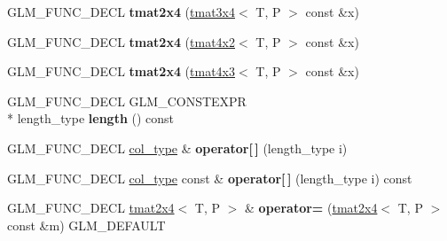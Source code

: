 \begin{DoxyCompactItemize}
\item 
\hypertarget{structglm_1_1tmat2x4_a20757872821d224e17ffb7664190c876}{G\-L\-M\-\_\-\-F\-U\-N\-C\-\_\-\-D\-E\-C\-L {\bfseries tmat2x4} (\hyperlink{structglm_1_1tmat3x4}{tmat3x4}$<$ T, P $>$ const \&x)}\label{structglm_1_1tmat2x4_a20757872821d224e17ffb7664190c876}

\item 
\hypertarget{structglm_1_1tmat2x4_a19f5c9f7ba03b6c8c33c5b0cbf3a6aa2}{G\-L\-M\-\_\-\-F\-U\-N\-C\-\_\-\-D\-E\-C\-L {\bfseries tmat2x4} (\hyperlink{structglm_1_1tmat4x2}{tmat4x2}$<$ T, P $>$ const \&x)}\label{structglm_1_1tmat2x4_a19f5c9f7ba03b6c8c33c5b0cbf3a6aa2}

\item 
\hypertarget{structglm_1_1tmat2x4_ad38c7c0cfff3150f24a55d71b80081d0}{G\-L\-M\-\_\-\-F\-U\-N\-C\-\_\-\-D\-E\-C\-L {\bfseries tmat2x4} (\hyperlink{structglm_1_1tmat4x3}{tmat4x3}$<$ T, P $>$ const \&x)}\label{structglm_1_1tmat2x4_ad38c7c0cfff3150f24a55d71b80081d0}

\item 
\hypertarget{structglm_1_1tmat2x4_ac07847f53f866de252b09d703e0d8373}{G\-L\-M\-\_\-\-F\-U\-N\-C\-\_\-\-D\-E\-C\-L G\-L\-M\-\_\-\-C\-O\-N\-S\-T\-E\-X\-P\-R \\*
length\-\_\-type {\bfseries length} () const }\label{structglm_1_1tmat2x4_ac07847f53f866de252b09d703e0d8373}

\item 
\hypertarget{structglm_1_1tmat2x4_a2bc91eaefd3d2fb68c70a5c0266f7be3}{G\-L\-M\-\_\-\-F\-U\-N\-C\-\_\-\-D\-E\-C\-L \hyperlink{structglm_1_1tvec4}{col\-\_\-type} \& {\bfseries operator\mbox{[}$\,$\mbox{]}} (length\-\_\-type i)}\label{structglm_1_1tmat2x4_a2bc91eaefd3d2fb68c70a5c0266f7be3}

\item 
\hypertarget{structglm_1_1tmat2x4_a9cb0ba95128c75266de5e54b3241695d}{G\-L\-M\-\_\-\-F\-U\-N\-C\-\_\-\-D\-E\-C\-L \hyperlink{structglm_1_1tvec4}{col\-\_\-type} const \& {\bfseries operator\mbox{[}$\,$\mbox{]}} (length\-\_\-type i) const }\label{structglm_1_1tmat2x4_a9cb0ba95128c75266de5e54b3241695d}

\item 
\hypertarget{structglm_1_1tmat2x4_aede37cfb95bee17411d6ac62fbdce058}{G\-L\-M\-\_\-\-F\-U\-N\-C\-\_\-\-D\-E\-C\-L \hyperlink{structglm_1_1tmat2x4}{tmat2x4}$<$ T, P $>$ \& {\bfseries operator=} (\hyperlink{structglm_1_1tmat2x4}{tmat2x4}$<$ T, P $>$ const \&m) G\-L\-M\-\_\-\-D\-E\-F\-A\-U\-L\-T}\label{structglm_1_1tmat2x4_aede37cfb95bee17411d6ac62fbdce058}


\end{DoxyCompactItemize}
